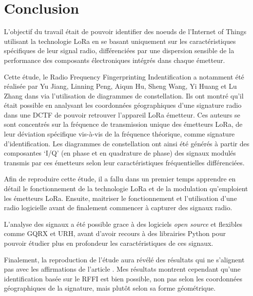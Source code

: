 \chapter*{Conclusion}
\renewcommand{\leftmark}{CONCLUSION}

L'objectif du travail était de pouvoir identifier des noeuds de l'Internet of Things utilisant la technologie LoRa en se basant uniquement sur les caractéristiques spécifiques de leur signal radio, différenciées par une dispersion sensible de la performance des composants électroniques intégrés dans chaque émetteur.
\vspace{0.1cm}

Cette étude, le Radio Frequency Fingerprinting Indentification a notamment été réalisée par Yu Jiang, Linning Peng, Aiqun Hu, Sheng Wang, Yi Huang et Lu Zhang dans \cite{loraDCTF} via l'utilisation de diagrammes de constellation. Ils ont montré qu'il était possible en analysant les coordonnées géographiques d'une signature radio dans une DCTF de pouvoir retrouver l'appareil LoRa émetteur. Ces auteurs se sont concentrés sur la fréquence de transmission unique des émetteurs LoRa, de leur déviation spécifique vis-à-vis de la fréquence théorique, comme signature d'identification. Les diagrammes de constellation ont ainsi été générés à partir des composantes ‘I/Q’ (en phase et en quadrature de phase) des signaux modulés transmis par ces émetteurs selon leur caractéristiques fréquentielles différenciées.

\vspace{0.1cm}

Afin de reproduire cette étude, il a fallu dans un premier temps apprendre en détail le fonctionnement de la technologie LoRa et  de la modulation qu'emploient les émetteurs LoRa. Ensuite, maitriser le fonctionnement et l'utilisation d'une radio logicielle avant de finalement commencer à capturer des signaux radio.

\vspace{0.1cm}

L'analyse des signaux a été possible grace à des logiciels \textit{open source} et flexibles comme GQRX et URH, avant d'avoir recours à des librairies Python pour pouvoir étudier plus en profondeur les caractéristiques de ces signaux.

\vspace{0.1cm}

Finalement, la reproduction de l'étude aura révélé des résultats qui ne s'ali\-gnent pas avec les affirmations de l'article \cite{loraDCTF}. Mes résultats montrent cependant qu'une identification basée sur le RFFI est bien possible, non pas selon les coordonnées géographiques de la signature, mais plutôt selon sa forme géométrique.

